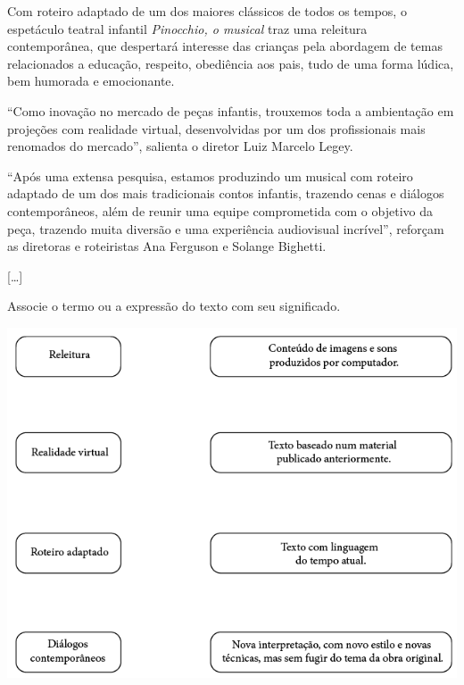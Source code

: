\begin{myquote}
Com roteiro adaptado de um dos maiores clássicos de todos os tempos, o
espetáculo teatral infantil \textit{Pinocchio, o musical} traz uma releitura
contemporânea, que despertará interesse das crianças pela abordagem de
temas relacionados a educação, respeito, obediência aos pais, tudo de
uma forma lúdica, bem humorada e emocionante.

“Como inovação no mercado de peças infantis, trouxemos toda a
ambientação em projeções com realidade virtual, desenvolvidas por um dos
profissionais mais renomados do mercado”, salienta o diretor Luiz
Marcelo Legey.

“Após uma extensa pesquisa, estamos produzindo um musical com roteiro
adaptado de um dos mais tradicionais contos infantis, trazendo cenas e
diálogos contemporâneos, além de reunir uma equipe comprometida com o
objetivo da peça, trazendo muita diversão e uma experiência audiovisual
incrível”, reforçam as diretoras e roteiristas Ana Ferguson e Solange
Bighetti.

{[}\ldots{}{]}

\end{myquote}

Associe o termo ou a expressão do texto com seu significado.

\begin{center}
\includegraphics[width=.8\textwidth]{../ilustracoes/ART5/SAEB_5ANO_ART_FIGURA7.png}
\end{center}



